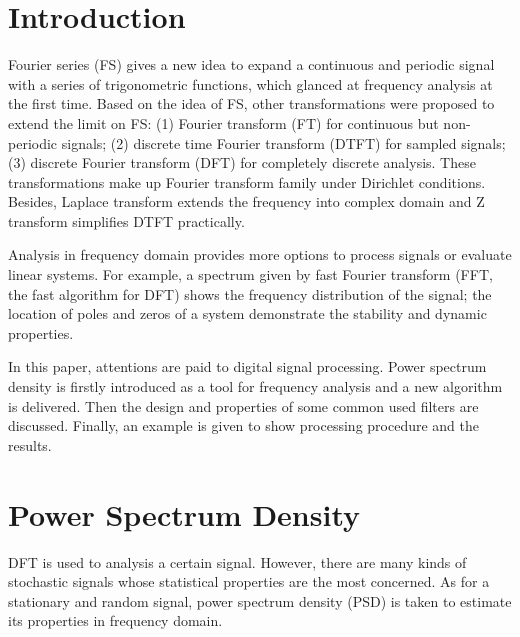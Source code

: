 \section{Introduction}


Fourier series (FS) gives a new idea to expand a continuous and periodic signal with a series of trigonometric functions, which glanced at frequency analysis at the first time. Based on the idea of FS, other transformations were proposed to extend the limit on FS: (1) Fourier transform (FT) for continuous but non-periodic signals; (2) discrete time Fourier transform (DTFT) for sampled signals; (3) discrete Fourier transform (DFT) for completely discrete analysis. These transformations make up Fourier transform family under Dirichlet conditions. Besides, Laplace transform extends the frequency into complex domain and Z transform simplifies DTFT practically.


Analysis in frequency domain provides more options to process signals or evaluate linear systems. For example, a spectrum given by fast Fourier transform (FFT, the fast algorithm for DFT) shows the frequency distribution of the signal; the location of poles and zeros of a system demonstrate the stability and dynamic properties.


In this paper, attentions are paid to digital signal processing. Power spectrum density is firstly introduced as a tool for frequency analysis and a new algorithm is delivered. Then the design and properties of some common used filters are discussed. Finally, an example is given to show processing procedure and the results.




\section{Power Spectrum Density}


DFT is used to analysis a certain signal. However, there are many kinds of stochastic signals whose statistical properties are the most concerned. As for a stationary and random signal, power spectrum density (PSD) is taken to estimate its properties in frequency domain.


